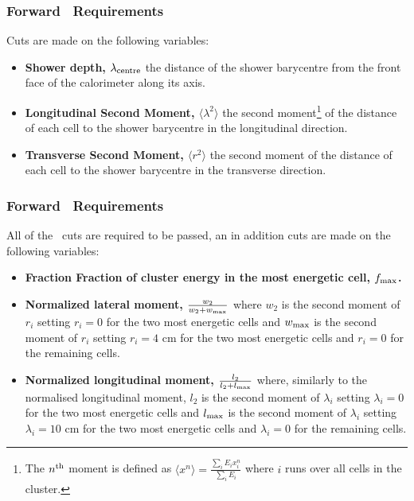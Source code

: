 \subsubsection{Forward \loose\ Requirements}

Cuts are made on the following variables:

\begin{itemize}
    \item {\bf Shower depth, $\lambda_{\rm centre}$} the distance of the shower
    barycentre from the front face of the calorimeter along its axis.  
    \item {\bf Longitudinal Second Moment, $\langle \lambda^2 \rangle$} the second
    moment\footnote{The $n^{\rm th}$ moment is defined as $\langle x^n \rangle =
    \frac{\sum_{i} E_i x^n_i}{\sum_{i} E_i}$ where $i$ runs over all cells in the
    cluster.} of the distance of each cell to
    the shower barycentre in the longitudinal direction.  
    \item {\bf Transverse Second Moment, $\langle r^2 \rangle$} the second moment of the 
    distance of each cell to the shower barycentre in the transverse direction.
\end{itemize}

\subsubsection{Forward \tight\ Requirements}

All of the \loose\ cuts are required to be passed, an in addition cuts are made
on the following variables:

\begin{itemize}
    \item {\bf Fraction Fraction of cluster energy in the most energetic cell,
    $f_{\rm max}$.}
    \item {\bf Normalized lateral moment, $\frac{w_{2}}{w_{2} + w_{\rm max}}$} where
    $w_{2}$ is the second moment of $r_{i}$ setting $r_{i} = 0$ for the two most
    energetic cells and $w_{\rm max}$ is the second moment of $r_{i}$ setting
    $r_{i} = 4$ cm for the two most energetic cells and $r_{i} = 0$ for the
    remaining cells.
    \item {\bf Normalized longitudinal moment, $\frac{l_{2}}{l_{2} + l_{\rm
    max}}$}
    where, similarly to the normalised longitudinal moment, 
    $l_{2}$ is the second moment of $\lambda_{i}$ setting $\lambda_{i} = 0$ for the two most
    energetic cells and $l_{\rm max}$ is the second moment of $\lambda_{i}$ setting
    $\lambda_{i} = 10$ cm for the two most energetic cells and $\lambda_{i} = 0$ for the
    remaining cells.
\end{itemize}

